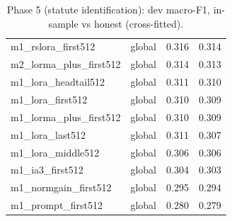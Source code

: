 \begin{table}[t]
\begin{tabular}{lrrr}
m1\_rslora\_first512 & global & 0.316 & 0.314 \\
m2\_lorma\_plus\_first512 & global & 0.314 & 0.313 \\
m1\_lora\_headtail512 & global & 0.311 & 0.310 \\
m1\_lora\_first512 & global & 0.310 & 0.309 \\
m1\_lorma\_plus\_first512 & global & 0.310 & 0.309 \\
m1\_lora\_last512 & global & 0.311 & 0.307 \\
m1\_lora\_middle512 & global & 0.306 & 0.306 \\
m1\_ia3\_first512 & global & 0.304 & 0.303 \\
m1\_normgain\_first512 & global & 0.295 & 0.294 \\
m1\_prompt\_first512 & global & 0.280 & 0.279 \\
\bottomrule
\end{tabular}
\caption{Phase 5 (statute identification): dev macro-F1, in-sample vs honest (cross-fitted).}
\label{tab:p5}
\end{table}
